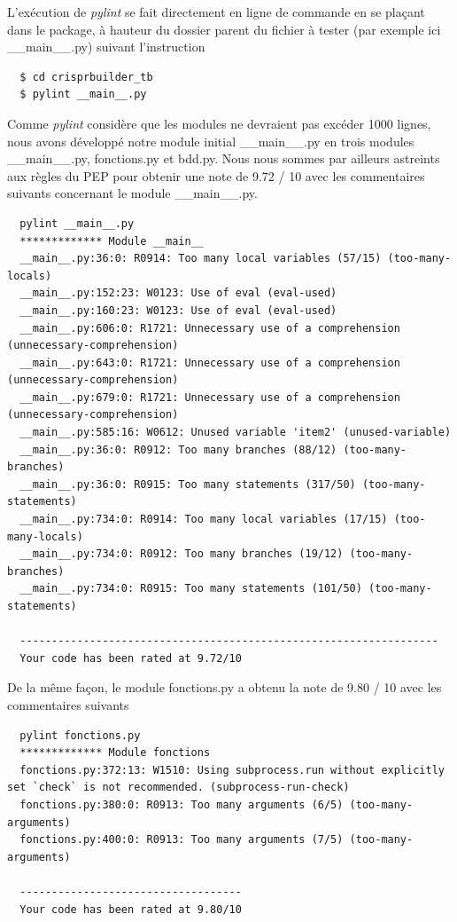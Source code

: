 \documentclass[twoside,a4paper,11pt,frenchb,openany]{report}
\begin{document}
L'exécution de \textit{pylint} se fait directement en ligne de commande en se plaçant dans le package, à hauteur du dossier parent du fichier à tester (par exemple ici \_\_main\_\_.py) suivant l'instruction

\begin{verbatim}  $ cd crisprbuilder_tb
  $ pylint __main__.py\end{verbatim}

Comme \textit{pylint} considère que les modules ne devraient pas excéder 1000 lignes, nous avons développé notre module initial \_\_main\_\_.py en trois modules \_\_main\_\_.py, fonctions.py et bdd.py. Nous nous sommes par ailleurs astreints aux règles du PEP pour obtenir une note de 9.72 / 10 avec les commentaires suivants concernant le module \_\_main\_\_.py. 

\begin{verbatim}  pylint __main__.py
  ************* Module __main__
  __main__.py:36:0: R0914: Too many local variables (57/15) (too-many-locals)
  __main__.py:152:23: W0123: Use of eval (eval-used)
  __main__.py:160:23: W0123: Use of eval (eval-used)
  __main__.py:606:0: R1721: Unnecessary use of a comprehension (unnecessary-comprehension)
  __main__.py:643:0: R1721: Unnecessary use of a comprehension (unnecessary-comprehension)
  __main__.py:679:0: R1721: Unnecessary use of a comprehension (unnecessary-comprehension)
  __main__.py:585:16: W0612: Unused variable 'item2' (unused-variable)
  __main__.py:36:0: R0912: Too many branches (88/12) (too-many-branches)
  __main__.py:36:0: R0915: Too many statements (317/50) (too-many-statements)
  __main__.py:734:0: R0914: Too many local variables (17/15) (too-many-locals)
  __main__.py:734:0: R0912: Too many branches (19/12) (too-many-branches)
  __main__.py:734:0: R0915: Too many statements (101/50) (too-many-statements)

  ------------------------------------------------------------------
  Your code has been rated at 9.72/10\end{verbatim}

De la même façon, le module fonctions.py a obtenu la note de 9.80 / 10 avec les commentaires suivants

\begin{verbatim}  pylint fonctions.py
  ************* Module fonctions
  fonctions.py:372:13: W1510: Using subprocess.run without explicitly set `check` is not recommended. (subprocess-run-check)
  fonctions.py:380:0: R0913: Too many arguments (6/5) (too-many-arguments)
  fonctions.py:400:0: R0913: Too many arguments (7/5) (too-many-arguments)

  -----------------------------------
  Your code has been rated at 9.80/10\end{verbatim}
\end{document}
